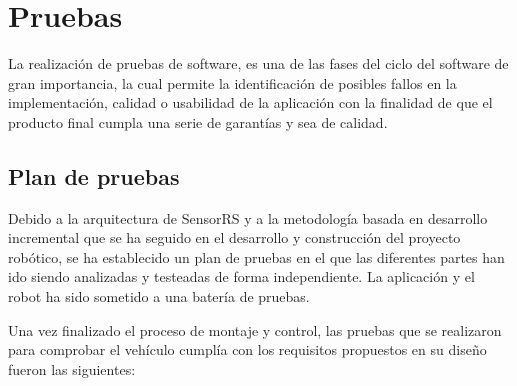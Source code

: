 

\newpage

\chapter{ Pruebas }
\label{chap:pruebas}

La realización de pruebas de software, es una de las fases del ciclo del software de gran importancia, la cual permite la identificación de posibles fallos en la implementación, 
calidad o usabilidad de la aplicación con la finalidad de que el producto final cumpla una serie de garantías y sea de calidad.\\

\section{Plan de pruebas}

Debido a la arquitectura de SensorRS y a la metodología basada en desarrollo incremental que se ha seguido en el desarrollo y construcción del proyecto robótico,
se ha establecido un plan de pruebas en el que las diferentes partes han ido siendo analizadas y testeadas de forma independiente. La aplicación y el robot ha sido sometido 
a una batería de pruebas. 

Una vez finalizado el proceso de montaje y control, las pruebas que se realizaron para comprobar el vehículo cumplía con los requisitos propuestos en su diseño fueron las siguientes:\\

